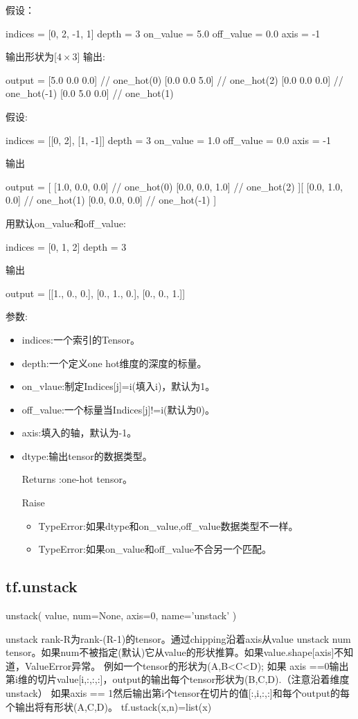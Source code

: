 假设：
\begin{python}
indices = [0, 2, -1, 1]
  depth = 3
  on_value = 5.0
  off_value = 0.0
  axis = -1
\end{python}
输出形状为[$4\times3$]
输出:
\begin{python}
output =
  [5.0 0.0 0.0]  // one_hot(0)
  [0.0 0.0 5.0]  // one_hot(2)
  [0.0 0.0 0.0]  // one_hot(-1)
  [0.0 5.0 0.0]  // one_hot(1)
\end{python}
假设:
\begin{python}
 indices = [[0, 2], [1, -1]]
  depth = 3
  on_value = 1.0
  off_value = 0.0
  axis = -1

\end{python}
输出
\begin{python}
output =
  [
    [1.0, 0.0, 0.0]  // one_hot(0)
    [0.0, 0.0, 1.0]  // one_hot(2)
  ][
    [0.0, 1.0, 0.0]  // one_hot(1)
    [0.0, 0.0, 0.0]  // one_hot(-1)
  ]
\end{python}
用默认on\_value和off\_value:
\begin{python}
indices = [0, 1, 2]
  depth = 3
\end{python}
输出
\begin{python}
  output =
  [[1., 0., 0.],
   [0., 1., 0.],
   [0., 0., 1.]]
\end{python}
参数:
\begin{itemize}
\item indices:一个索引的Tensor。
\item depth:一个定义one hot维度的深度的标量。
\item on\_vlaue:制定Indices[j]=i(填入i)，默认为1。
\item off\_value:一个标量当Indices[j]!=i(默认为0)。
\item axis:填入的轴，默认为-1。
\item dtype:输出tensor的数据类型。
\item [Returns]:one-hot tensor。
\item [Raise]
\begin{itemize}
\item TypeError:如果dtype和on\_value,off\_value数据类型不一样。
\item TypeError:如果on\_value和off\_value不合另一个匹配。
\end{itemize}
\end{itemize}
\subsection{tf.unstack}
\begin{python}
unstack(
    value,
    num=None,
    axis=0,
    name='unstack'
)
\end{python}
unstack rank-R为rank-(R-1)的tensor。通过chipping沿着axis从value unstack num tensor。如果num不被指定(默认)它从value的形状推算。如果value.shape[axis]不知道，ValueError异常。
例如一个tensor的形状为(A,B<C<D);
如果 axis ==0输出第i维的切片value[i,:,:,:]，output的输出每个tensor形状为(B,C,D).（注意沿着维度unstack）
如果axis == 1然后输出第i个tensor在切片的值[:,i,:,:]和每个output的每个输出将有形状(A,C,D)。
tf.ustack(x,n)=list(x)

